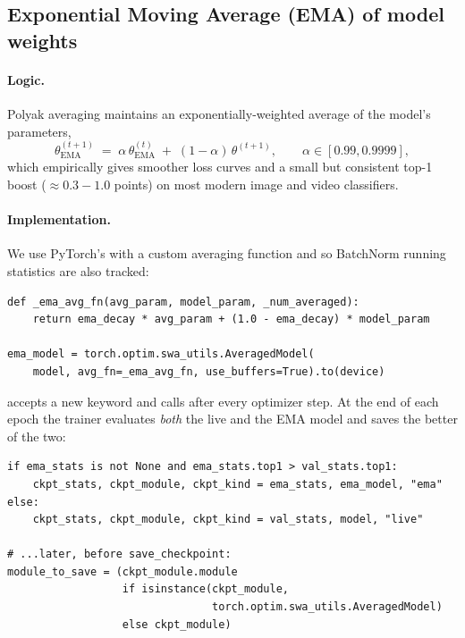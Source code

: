 \subsection{Exponential Moving Average (EMA) of model weights}
\label{sec:phase2:ema}

\paragraph{Logic.} Polyak averaging \cite{PolyakSIAM1992} maintains an
exponentially-weighted average of the model's parameters,
\[
\theta_{\mathrm{EMA}}^{(t+1)} \;=\;
\alpha\,\theta_{\mathrm{EMA}}^{(t)} \;+\;
(1-\alpha)\,\theta^{(t+1)}, \qquad \alpha \in [0.99, 0.9999],
\]
which empirically gives smoother loss curves and a small but consistent
top-1 boost (\(\approx 0.3{-}1.0\) points) on most modern image and
video classifiers.

\paragraph{Implementation.} We use PyTorch's
 with a custom averaging
function and  so BatchNorm running statistics are
also tracked:

\begin{lstlisting}[style=py]
def _ema_avg_fn(avg_param, model_param, _num_averaged):
    return ema_decay * avg_param + (1.0 - ema_decay) * model_param

ema_model = torch.optim.swa_utils.AveragedModel(
    model, avg_fn=_ema_avg_fn, use_buffers=True).to(device)
\end{lstlisting}

 accepts a new  keyword and
calls  after every optimizer
step. At the end of each epoch the trainer evaluates \emph{both} the
live and the EMA model and saves the better of the two:

\begin{lstlisting}[style=py]
if ema_stats is not None and ema_stats.top1 > val_stats.top1:
    ckpt_stats, ckpt_module, ckpt_kind = ema_stats, ema_model, "ema"
else:
    ckpt_stats, ckpt_module, ckpt_kind = val_stats, model, "live"

# ...later, before save_checkpoint:
module_to_save = (ckpt_module.module
                  if isinstance(ckpt_module,
                                torch.optim.swa_utils.AveragedModel)
                  else ckpt_module)
\end{lstlisting}

